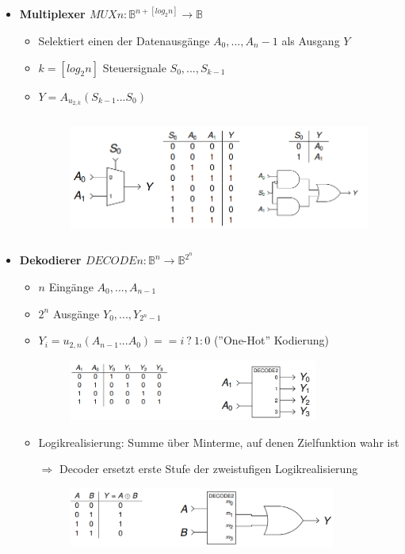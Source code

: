 \documentclass[11pt,a4paper]{article}
\begin{document}
\begin{itemize}
\item \textbf{Multiplexer $MUXn: \mathbb{B}^{n+[log_2n]} \rightarrow \mathbb{B}$}
	\begin{itemize}
	\item Selektiert einen der Datenausgänge $A_0,...,A_n-1$ als Ausgang $Y$
	\item $k = [log_2n]$ Steuersignale $S_0,...,S_{k-1}$
	\item $Y= A_{u_{2,k}}(S_{k-1}...S_0)$
	\item[] \begin{figure}[H]
				\begin{center}
				\includegraphics[height=4cm]{Bilder/multiplexer}
				\end{center}
			\end{figure}
	\end{itemize}
	
\item \textbf{Dekodierer $DECODEn: \mathbb{B}^n \rightarrow \mathbb{B}^{2^n}$}
	\begin{itemize}
	\item $n$ Eingänge $A_0,...,A_{n-1}$
	\item $2^n$ Ausgänge $Y_0,...,Y_{2^n-1}$
	\item $Y_i = u_{2,n}(A_{n-1}...A_0) == i~?~ 1:0$ (''One-Hot'' Kodierung)
	\item[] \begin{figure}[H]
				\begin{center}
				\includegraphics[height=2cm]{Bilder/dekodierer}
				\end{center}
			\end{figure}
	\item Logikrealisierung: Summe über Minterme, auf denen Zielfunktion wahr ist
	\item[$\Rightarrow$] Decoder ersetzt erste Stufe der zweistufigen Logikrealisierung
	\item[] \begin{figure}[H]
				\begin{center}
				\includegraphics[height=2cm]{Bilder/dekodierer2}
				\end{center}
			\end{figure}
	\end{itemize}

\end{itemize}
\end{document}
